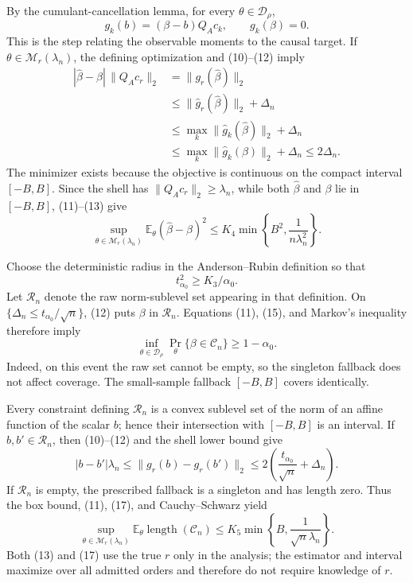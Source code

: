 By the cumulant-cancellation lemma, for every \(\theta\in\mathcal D_\rho\),
\[
 g_k(b)=(\beta-b)Q_Ac_k,
 \qquad g_k(\beta)=0. \tag{12}
\]
This is the step relating the observable moments to the causal target.  If \(\theta\in\mathcal M_r(\lambda_n)\), the defining optimization and (10)--(12) imply
\[
 \begin{aligned}
 |\widehat\beta-\beta|\,\|Q_Ac_r\|_2
 &=\|g_r(\widehat\beta)\|_2\\
 &\leq \|\widehat g_r(\widehat\beta)\|_2+\Delta_n\\
 &\leq \max_k\|\widehat g_k(\widehat\beta)\|_2+\Delta_n\\
 &\leq \max_k\|\widehat g_k(\beta)\|_2+\Delta_n
 \leq2\Delta_n.
 \end{aligned} \tag{13}
\]
The minimizer exists because the objective is continuous on the compact interval \([-B,B]\).  Since the shell has \(\|Q_Ac_r\|_2\geq\lambda_n\), while both \(\widehat\beta\) and \(\beta\) lie in \([-B,B]\), (11)--(13) give
\[
 \sup_{\theta\in\mathcal M_r(\lambda_n)}
 \mathbb E_\theta(\widehat\beta-\beta)^2
 \leq K_4\min\!\left\{B^2,\frac{1}{n\lambda_n^2}\right\}. \tag{14}
\]

Choose the deterministic radius in the Anderson--Rubin definition so that
\[
 t_{\alpha_0}^2\geq K_3/\alpha_0. \tag{15}
\]
Let \(\mathcal R_n\) denote the raw norm-sublevel set appearing in that definition.  On \(\{\Delta_n\leq t_{\alpha_0}/\sqrt n\}\), (12) puts \(\beta\) in \(\mathcal R_n\).  Equations (11), (15), and Markov's inequality therefore imply
\[
 \inf_{\theta\in\mathcal D_\rho}
 \Pr_\theta\{\beta\in\mathcal C_n\}\geq1-\alpha_0. \tag{16}
\]
Indeed, on this event the raw set cannot be empty, so the singleton fallback does not affect coverage.  The small-sample fallback \([-B,B]\) covers identically.

Every constraint defining \(\mathcal R_n\) is a convex sublevel set of the norm of an affine function of the scalar \(b\); hence their intersection with \([-B,B]\) is an interval.  If \(b,b'\in\mathcal R_n\), then (10)--(12) and the shell lower bound give
\[
 |b-b'|\lambda_n
 \leq\|g_r(b)-g_r(b')\|_2
 \leq2\left(\frac{t_{\alpha_0}}{\sqrt n}+\Delta_n\right). \tag{17}
\]
If \(\mathcal R_n\) is empty, the prescribed fallback is a singleton and has length zero.  Thus the box bound, (11), (17), and Cauchy--Schwarz yield
\[
 \sup_{\theta\in\mathcal M_r(\lambda_n)}
 \mathbb E_\theta\operatorname{length}(\mathcal C_n)
 \leq K_5\min\!\left\{B,\frac{1}{\sqrt n\lambda_n}\right\}. \tag{18}
\]
Both (13) and (17) use the true \(r\) only in the analysis; the estimator and interval maximize over all admitted orders and therefore do not require knowledge of \(r\).

